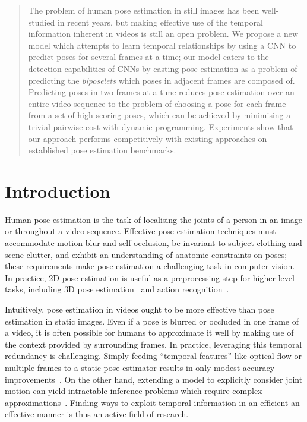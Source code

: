 \documentclass[runningheads]{llncs}
\begin{document}
\begin{abstract}
The problem of human pose estimation in still images has been well-studied in
recent years, but making effective use of the temporal information inherent in
videos is still an open problem. We propose a new model which attempts to learn
temporal relationships by using a CNN to predict poses for several frames at a
time; our model caters to the detection capabilities of CNNs by casting pose
estimation as a problem of predicting the \textit{biposelets} which poses in
adjacent frames are composed of. Predicting poses in two frames at a time
reduces pose estimation over an entire video sequence to the problem of choosing
a pose for each frame from a set of high-scoring poses, which can be achieved by
minimising a trivial pairwise cost with dynamic programming. Experiments show
that our approach performs competitively with existing approaches on established
pose estimation benchmarks.
\end{abstract}

\section{Introduction}\label{sec:intro}

Human pose estimation is the task of localising the joints of a person in an
image or throughout a video sequence. Effective pose estimation techniques must
accommodate motion blur and self-occlusion, be invariant to subject clothing and
scene clutter, and exhibit an understanding of anatomic constraints on poses;
these requirements make pose estimation a challenging task in computer vision.
In practice, 2D pose estimation is useful as a preprocessing step for
higher-level tasks, including 3D pose
estimation~\cite{andriluka2010monocular,zhou2016spatio} and action
recognition~\cite{cheron2015p,yao2011does}.

Intuitively, pose estimation in videos ought to be more effective than pose
estimation in static images. Even if a pose is blurred or occluded in one frame
of a video, it is often possible for humans to approximate it well by making use
of the context provided by surrounding frames. In practice, leveraging this
temporal redundancy is challenging. Simply feeding ``temporal features'' like
optical flow or multiple frames to a static pose estimator results in only
modest accuracy improvements~\cite{jain2014modeep}. On the other hand, extending
a model to explicitly consider joint motion can yield intractable inference
problems which require complex approximations~\cite{cherian2014mixing}.
Finding ways to exploit temporal information in an efficient an effective manner
is thus an active field of research.
\end{document}
